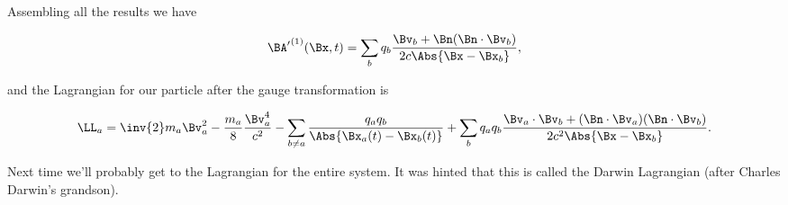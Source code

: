 Assembling all the results we have

\begin{equation}\label{eqn:relativisticElectrodynamicsL25:450}
{\BA'}^{(1)}(\Bx, t) = \sum_b q_b \frac{\Bv_b + \Bn (\Bn \cdot \Bv_b)}{2 c \Abs{\Bx - \Bx_b} },
\end{equation}

and the Lagrangian for our particle after the gauge transformation is

\begin{equation}\label{eqn:relativisticElectrodynamicsL25:330b}
\LL_a = \inv{2} m_a \Bv_a^2 - \frac{m_a}{8} \frac{\Bv_a^4}{c^2} 
-\sum_{b \ne a} \frac{q_a q_b}{\Abs{\Bx_a(t) - \Bx_b(t)}}
+\sum_b q_a q_b \frac{\Bv_a \cdot \Bv_b + (\Bn \cdot \Bv_a) (\Bn \cdot \Bv_b)}{2 c^2 \Abs{\Bx - \Bx_b} }.
\end{equation}

Next time we'll probably get to the Lagrangian for the entire system.  It was hinted that this is called the Darwin Lagrangian (after Charles Darwin's grandson).

\EndArticle
